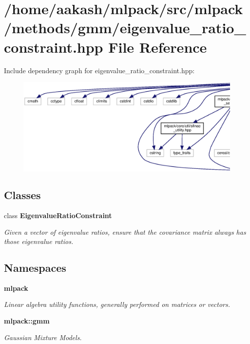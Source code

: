 \section{/home/aakash/mlpack/src/mlpack/methods/gmm/eigenvalue\+\_\+ratio\+\_\+constraint.hpp File Reference}
\label{eigenvalue__ratio__constraint_8hpp}
Include dependency graph for eigenvalue\+\_\+ratio\+\_\+constraint.\+hpp\+:
\nopagebreak
\begin{figure}[H]
\begin{center}
\leavevmode
\includegraphics[width=350pt]{eigenvalue__ratio__constraint_8hpp__incl}
\end{center}
\end{figure}
\subsection*{Classes}
\begin{DoxyCompactItemize}
\item 
class \textbf{ Eigenvalue\+Ratio\+Constraint}
\begin{DoxyCompactList}\small\item\em Given a vector of eigenvalue ratios, ensure that the covariance matrix always has those eigenvalue ratios. \end{DoxyCompactList}\end{DoxyCompactItemize}
\subsection*{Namespaces}
\begin{DoxyCompactItemize}
\item 
 \textbf{ mlpack}
\begin{DoxyCompactList}\small\item\em Linear algebra utility functions, generally performed on matrices or vectors. \end{DoxyCompactList}\item 
 \textbf{ mlpack\+::gmm}
\begin{DoxyCompactList}\small\item\em Gaussian Mixture Models. \end{DoxyCompactList}\end{DoxyCompactItemize}


